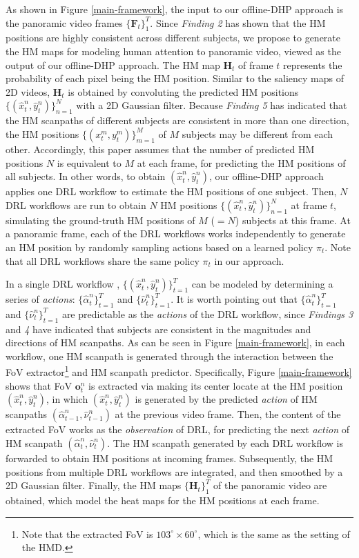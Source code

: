 \documentclass[10pt,journal,compsoc]{IEEEtran}
\begin{document}
As shown in Figure \ref{main-framework}, the input to our offline-DHP approach is the panoramic video frames $\{\mathbf{F}_t\}_1^{T}$.
Since \textit{Finding 2} has shown that the HM positions are highly consistent across different subjects,  we propose to generate the HM maps for modeling human attention to panoramic video, viewed as the output of our offline-DHP approach. The HM map $\mathbf{H}_t$ of frame $t$ represents the probability of each pixel being the HM position.
Similar to the saliency maps of 2D videos, $\mathbf{H}_t$ is obtained by convoluting the predicted HM positions $\{(\hat{x}^n_t, \hat{y}^n_t)\}_{n=1}^{N}$ with a 2D Gaussian filter.
Because \textit{Finding 5} has indicated that the HM scanpaths of different subjects are consistent in more than one direction, the HM positions $\{({x}^m_t, {y}^m_t)\}_{m=1}^{M}$ of $M$ subjects may be different from each other. Accordingly, this paper assumes that the number of predicted HM positions $N$ is equivalent to $M$ at each frame, for predicting the HM positions of all subjects.
In other words, to obtain $(\hat{x}^n_t, \hat{y}^n_t)$, our offline-DHP approach applies one DRL workflow to estimate the HM positions of one subject.
Then, $N$ DRL workflows are run to obtain $N$ HM positions $\{(\hat{x}^n_t, \hat{y}^n_t)\}_{n=1}^{N}$ at frame $t$, simulating the ground-truth HM positions of $M$ ($=N$) subjects at this frame.
At a panoramic frame, each of the DRL workflows works independently to generate an HM position by randomly sampling actions based on a learned policy $\pi_t$.
Note that all DRL workflows share the same policy $\pi_t$ in our approach.

In a single DRL workflow , $\{(\hat{x}^n_t, \hat{y}^n_t)\}_{t=1}^T$ can be modeled by determining a series of \textit{actions}: $\{\hat{\alpha}^n_t\}_{t=1}^T$ and $\{\hat{\nu}^n_t\}_{t=1}^T$.
It is worth pointing out that $\{\hat{\alpha}^n_t\}_{t=1}^{T}$ and $\{\hat{\nu}^n_t\}_{t=1}^{T}$ are predictable as the \textit{actions} of the DRL workflow, since \textit{Findings 3} and \textit{4} have indicated that subjects are consistent in the magnitudes and directions of HM scanpaths.
As can be seen in Figure \ref{main-framework}, in each workflow, one HM scanpath is generated through the interaction between the FoV extractor\footnote{Note that the extracted FoV is $103^{\circ} \times 60^{\circ}$, which is the same as the setting of the HMD.} and HM scanpath predictor.
Specifically, Figure \ref{main-framework} shows that FoV $\mathbf{o}^n_t$ is extracted via making its center locate at the HM position $(\hat{x}^n_t,\hat{y}^n_t)$, in which $(\hat{x}^n_t,\hat{y}^n_t)$ is generated by the predicted \textit{action} of HM scanpaths $(\hat{\alpha}^n_{t-1},\hat{\nu}^n_{t-1})$ at the previous video frame.
Then, the content of the extracted FoV works as the \textit{observation} of DRL, for predicting the next \textit{action} of HM scanpath $(\hat{\alpha}^n_{t},\hat{\nu}^n_{t})$.
The HM scanpath generated by each DRL workflow is forwarded to obtain HM positions at incoming frames.
Subsequently, the HM positions from multiple DRL workflows are integrated, and then smoothed by a 2D Gaussian filter.
Finally, the HM maps $\{\mathbf{H}_t\}_1^{T}$ of the panoramic video are obtained, which model the heat maps for the HM positions at each frame.
\end{document}
